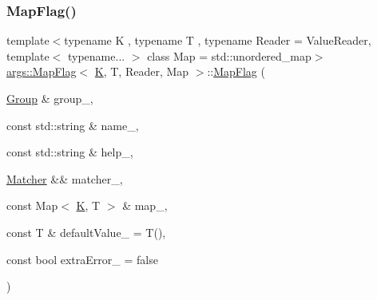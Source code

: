 \subsubsection{\texorpdfstring{Map\+Flag()}{MapFlag()}\hspace{0.1cm}{\footnotesize\ttfamily [2/3]}}
{\footnotesize\ttfamily template$<$typename K , typename T , typename Reader  = Value\+Reader, template$<$ typename... $>$ class Map = std\+::unordered\+\_\+map$>$ \\
\hyperlink{classargs_1_1_map_flag}{args\+::\+Map\+Flag}$<$ \hyperlink{cgal__test_8cpp_a891e241aa245ae63618f03737efba309}{K}, T, Reader, Map $>$\+::\hyperlink{classargs_1_1_map_flag}{Map\+Flag} (\begin{DoxyParamCaption}\item[{\hyperlink{classargs_1_1_group}{Group} \&}]{group\+\_\+,  }\item[{const std\+::string \&}]{name\+\_\+,  }\item[{const std\+::string \&}]{help\+\_\+,  }\item[{\hyperlink{classargs_1_1_matcher}{Matcher} \&\&}]{matcher\+\_\+,  }\item[{const Map$<$ \hyperlink{cgal__test_8cpp_a891e241aa245ae63618f03737efba309}{K}, T $>$ \&}]{map\+\_\+,  }\item[{const T \&}]{default\+Value\+\_\+ = {\ttfamily T()},  }\item[{const bool}]{extra\+Error\+\_\+ = {\ttfamily false} }\end{DoxyParamCaption})\hspace{0.3cm}{\ttfamily [inline]}}

\mbox{\label{classargs_1_1_map_flag_a2da594dc6378fcaeca63e1dcb8b4d816}} 
